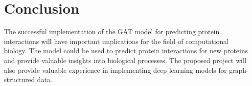 \documentclass{article}
\begin{document}
    \section{Conclusion}\label{sec:conclusion}

    The successful implementation of the GAT model for predicting protein interactions will have important implications for the field of computational biology.
    The model could be used to predict protein interactions for new proteins and provide valuable insights into biological processes.
    The proposed project will also provide valuable experience in implementing deep learning models for graph-structured data.


    
\end{document}

